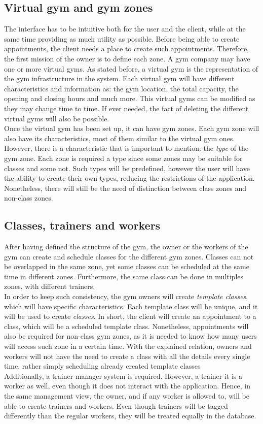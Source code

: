 \documentclass[a4paper, 12pt, oneside]{book}
\begin{document}
\subsection{Virtual gym and gym zones}
The interface has to be intuitive both for the user and the client, while at the same time providing as much utility as possible. Before being able to create appointments, the client needs a place to create such appointments. Therefore, the first mission of the owner is to define each zone. A gym company may have one or more virtual gyms. As stated before, a virtual gym is the representation of the gym infrastructure in the system. Each virtual gym will have different characteristics and information as: the gym location, the total capacity, the opening and closing hours and much more. This virtual gyms can be modified as they may change time to time. If ever needed, the fact of deleting the different virtual gyms will also be possible.
\\[8pt]
Once the virtual gym has been set up, it can have gym zones. Each gym zone will also have its characteristics, most of them similar to the virtual gym ones. However, there is a characteristic that is important to mention: the \emph{type} of the gym zone. Each zone is required a type since some zones may be suitable for classes and some not. Such types will be predefined, however the user will have the ability to create their own types, reducing the restrictions of the application. Nonetheless, there will still be the need of distinction between class zones and non-class zones.
\subsection{Classes, trainers and workers}
After having defined the structure of the gym, the owner or the workers of the gym can create and schedule classes for the different gym zones. Classes can not be overlapped in the same zone, yet some classes can be scheduled at the same time in different zones. Furthermore, the same class can be done in multiples zones, with different trainers.
\\[8pt]
In order to keep such consistency, the gym owners will create \emph{template classes}, which will have specific characteristics. Each template class will be unique, and it will be used to create \emph{classes}. In short, the client will create an appointment to a class, which will be a scheduled template class. Nonetheless, appointments will also be required for non-class gym zones, as it is needed to know how many users will access such zone in a certain time. With the explained relation, owners and workers will not have the need to create a class with all the details every single time, rather simply scheduling already created template classes
\\[8pt]
Additionally, a trainer manager system is required. However, a trainer it is a worker as well, even though it does not interact with the application. Hence, in the same management view, the owner, and if any worker is allowed to, will be able to create trainers and workers. Even though trainers will be tagged differently than the regular workers, they will be treated equally in the database.
\end{document}
